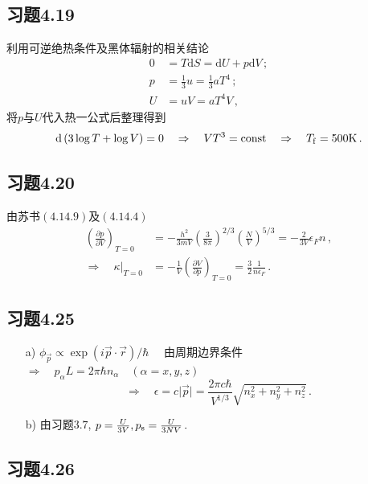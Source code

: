 \documentclass[letterpaper, 10pt]{article}
\newcommand{\dd}{\mathrm{d}}
\begin{document}
\subsection{习题4.19}
利用可逆绝热条件及黑体辐射的相关结论
\begin{align*}
0 & =  T \dd S = \dd U + p\dd V \,; \\
p & = \frac{1}{3} u = \frac{1}{3} a T^{4} \,; \\
U & = uV = a T^{4} V \,,
\end{align*}
将$p$与$U$代入热一公式后整理得到
\[ \dd \left( 3 \log{T} + \log{V} \right) = 0 \quad{} \Rightarrow \quad{} VT^{3} = {\rm const} \quad{} \Rightarrow \quad{} T_{\rm f} = 500 {\rm K}\,. \]

\subsection{习题4.20}
由苏书$(4.14.9)$及$(4.14.4)$
\begin{align*}
\left( \frac{\partial p}{\partial V} \right)_{T=0} & = - \frac{h^{2}}{3mV} \left( \frac{3}{8\pi} \right)^{2/3} \left( \frac{N}{V} \right)^{5/3} = - \frac{2}{3V} \epsilon_{F} n \,, \\
\Rightarrow \quad{} \kappa\rvert_{T=0} & = - \frac{1}{V} \left( \frac{\partial V}{\partial p} \right)_{T=0} = \frac{3}{2} \frac{1}{n\epsilon_{F}}\,.
\end{align*}

\subsection{习题4.25}
\begin{itemize}
	\item[a)]
	$\phi_{\vec{p}} \propto \exp{(i \vec{p} \cdot \vec{r})/\hbar} \quad{}$ 由周期边界条件 $\Rightarrow \quad{} p_{\alpha} L = 2\pi\hbar n_{\alpha}\quad{} (\alpha = x, y, z)$
	\[ \Rightarrow \quad{} \epsilon = c\lvert{\vec{p}}\rvert = \frac{2\pi c\hbar}{V^{1/3}} \sqrt{n_{x}^{2}+n_{y}^{2}+n_{z}^{2}}\,. \]
	\item[b)]
	由习题$3.7$, $p=\frac{U}{3V}, p_{\rm s}=\frac{U}{3NV}\,.$
\end{itemize}

\subsection{习题4.26}
\end{document}
